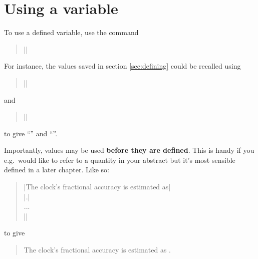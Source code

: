 \documentclass[a4paper]{ltxdoc}
\begin{document}
\section{Using a variable}

\DescribeMacro{\useVal} 
To use a defined variable, use the command
\begin{quote}
	||
\end{quote}

For instance, the values saved in section \ref{sec:defining} could be recalled using
\begin{quote}
	||
\end{quote}
and
\begin{quote}
	||
\end{quote}
%
to give ``'' and ``''. 

Importantly, values may be used \textbf{before they are defined}. This is handy if you e.g.\ would like to refer to a quantity in your abstract but it's most sensible defined in a later chapter. Like so:
\begin{quote}
	|The clock's fractional accuracy is estimated as| \\
	|.| \\
	... \\
	||
\end{quote}
to give
\begin{quote}
	The clock's fractional accuracy is estimated as
	. 
\end{quote}
\end{document}
